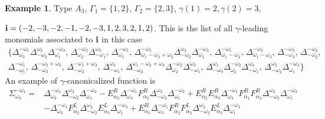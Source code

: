 \documentclass[a4paper]{amsart}
\theoremstyle{definition}
\newtheorem{example}[theorem]{Example}
\begin{document}
\begin{example}
  Type $A_3$, $\Gamma_1=\{1,2\}$, $\Gamma_2=\{2,3\}$, $\gamma(1)=2, \gamma(2)=3$,\par${\bf i}=(-2, -3, -2, -1, -2, -3, 1, 2, 3, 2, 1, 2)$.
  This is the list of all $\gamma$-leading monomials associated to ${\bf i}$ in this case
  \begin{align*}
    \Big\{
    \Delta_{ \omega_{3} }^{ -\omega_{1} } \Delta_{ -\omega_{2} }^{ \omega_{2} } \Delta_{ \omega_{1} }^{ -\omega_{3} },\,
    \Delta_{ \omega_{2} }^{ -\omega_{2} } \Delta_{ -\omega_{1} }^{ \omega_{3} },\,
    \Delta_{ \omega_{1} }^{ -\omega_{3} },\,
    \Delta_{ \omega_{1} - \omega_{2} + \omega_{3} }^{ -\omega_{2} } \Delta_{ -\omega_{2} }^{ \omega_{2} } \Delta_{ \omega_{1} }^{ -\omega_{3} },\,
    \Delta_{ \omega_{1} - \omega_{2} }^{ -\omega_{1} },\,
    \Delta_{ \omega_{1} - \omega_{3} }^{ -\omega_{2} },\,
    \Delta_{ -\omega_{3} }^{ -\omega_{3} },\,
    \Delta_{ -\omega_{2} }^{ -\omega_{2} },\,\\
    \Delta_{ -\omega_{1} }^{ -\omega_{1} },\,
    \Delta_{ -\omega_{3} }^{ -\omega_{2} + \omega_{3} },\,
    \Delta_{ -\omega_{2} }^{ -\omega_{1} + \omega_{3} },\,
    \Delta_{ -\omega_{1} }^{ \omega_{3} },\,
    \Delta_{ -\omega_{2} }^{ \omega_{1} - \omega_{2} + \omega_{3} } \Delta_{ \omega_{2} }^{ -\omega_{2} } \Delta_{ -\omega_{1} }^{ \omega_{3} },\,
    \Delta_{ -\omega_{3} }^{ \omega_{1} } \Delta_{ \omega_{2} }^{ -\omega_{2} } \Delta_{ -\omega_{1} }^{ \omega_{3} },\,
    \Delta_{ -\omega_{2} }^{ \omega_{2} } \Delta_{ \omega_{1} }^{ -\omega_{3} }
    \Big\}
  \end{align*}
  An example of $\gamma$-canonicalized function is
  \begin{align*}
    \Sigma_{ \omega_{3} }^{ -\omega_{1} } 
    = &
    \Delta_{ \omega_{3} }^{ -\omega_{1} } \Delta_{ -\omega_{2} }^{ \omega_{2} } \Delta_{ \omega_{1} }^{ -\omega_{3} }
    -
    E_{\alpha_3}^R\Delta_{ \omega_{3} }^{ -\omega_{1} } F_{\alpha_2}^R\Delta_{ -\omega_{2} }^{ \omega_{2} } \Delta_{ \omega_{1} }^{ -\omega_{3} }
    + 
    E_{\alpha_2}^RE_{\alpha_3}^R\Delta_{ \omega_{3} }^{ -\omega_{1} } F_{\alpha_1}^RF_{\alpha_2}^R\Delta_{ -\omega_{2} }^{ \omega_{2} } \Delta_{ \omega_{1} }^{ -\omega_{3} }\\&
    -
    \Delta_{ \omega_{3} }^{ -\omega_{1} } F_{\alpha_2}^L\Delta_{ -\omega_{2} }^{ \omega_{2} } E_{\alpha_3}^L\Delta_{ \omega_{1} }^{ -\omega_{3} }
    +
    E_{\alpha_3}^R\Delta_{ \omega_{3} }^{ -\omega_{1} } F_{\alpha_2}^R F_{\alpha_2}^L\Delta_{ -\omega_{2} }^{ \omega_{2} } E_{\alpha_3}^L\Delta_{ \omega_{1} }^{ -\omega_{3} }\\&

\end{align*}
\end{example}
\end{document}

